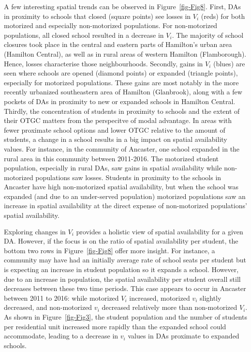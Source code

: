 \documentclass[
default
]{sn-jnl}
\begin{document}
A few interesting spatial trends can be observed in
Figure~\ref{fig-Fig8}. First, DAs in proximity to schools that closed
(square points) see losses in \(V_i\) (reds) for both motorized and
especially non-motorized populations. For non-motorized populations, all
closed school resulted in a decrease in \(V_i\). The majority of school
closures took place in the central and eastern parts of Hamilton's urban
area (Hamilton Central), as well as in rural areas of western Hamilton
(Flamborough). Hence, losses characterise those neighbourhoods.
Secondly, gains in \(V_i\) (blues) are seen where schools are opened
(diamond points) or expanded (triangle points), especially for motorized
populations. These gains are most notably in the more recently urbanized
southeastern area of Hamilton (Glanbrook), along with a few pockets of
DAs in proximity to new or expanded schools in Hamilton Central.
Thirdly, the concentration of students in proximity to schools and the
extent of their OTGC matters from the perspecitve of modal advantage. In
areas with fewer proximate school options and lower OTGC relative to the
amount of students, a change in a school results in a big impact on
spatial availability values. For instance, in the community of Ancaster,
one school expanded in the rural area in this community between
2011-2016. The motorized student population, especially in rural DAs,
saw gains in spatial availability while non-motorized populations saw
losses. Students in proximity to the schools in Ancaster have high
non-motorized spatial availability, but when the school was expanded
(and due to an under-served population) motorized populations saw an
increase in spatial availability at the direct expense of non-motorized
populations' spatial availability.

Exploring changes in \(V_i\) provides a holistic view of spatial
availability for a given DA. However, if the focus is on the ratio of
spatial availability per student, the bottom two rows in
Figure~\ref{fig-Fig8} offer more insight. For instance, a community may
have had an initially average rate of school seats per student but is
expecting an increase in student population so it expands a school.
However, due to an increase in population, the spatial availability per
student overall still decreases between these two time periods. This
case appears to occur in Ancaster between 2011 to 2016: while motorized
\(V_i\) increased, motorized \(v_i\) slightly decreased, and
non-motorized \(v_i\) decreased relatively more than non-motorized
\(V_i\). As shown in Figure~\ref{fig-Fig3}, the student population and
the number of students per residential unit increased more rapidly than
the expanded school could accommodate, leading to a decrease in \(v_i\)
values in DAs proximate to expanded schools.
\end{document}
